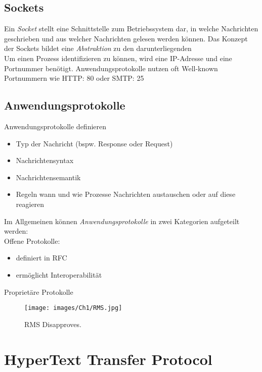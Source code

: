 \subsection{Sockets}
Ein \emph{Socket} stellt eine Schnittstelle zum Betriebssystem dar, in welche Nachrichten geschrieben und aus welcher Nachrichten gelesen werden können. Das Konzept der Sockets bildet eine \emph{Abstraktion} zu den darunterliegenden \\
\noindent Um einen Prozess identifizieren zu können, wird eine IP-Adresse und eine Portnummer benötigt. Anwendungsprotokolle nutzen oft Well-known Portnummern wie HTTP: 80 oder SMTP: 25

\subsection{Anwendungsprotokolle}
Anwendungsprotokolle definieren 
\begin{itemize}
    \item Typ der Nachricht (bspw. Response oder Request)
    \item Nachrichtensyntax
    \item Nachrichtensemantik
    \item Regeln wann und wie Prozesse Nachrichten austauschen oder auf diese reagieren
\end{itemize}

\noindent Im Allgemeinen können \emph{Anwendungsprotokolle} in zwei Kategorien aufgeteilt werden:\\
\noindent Offene Protokolle:
\begin{itemize}
    \item definiert in RFC
    \item ermöglicht Interoperabilität
\end{itemize}
\noindent Proprietäre Protokolle

\begin{figure}[H]
    \centering
    \texttt{[image: images/Ch1/RMS.jpg]}
    \caption{RMS Disapproves.}
    \label{fig:RMS}
\end{figure}

\section{HyperText Transfer Protocol}
